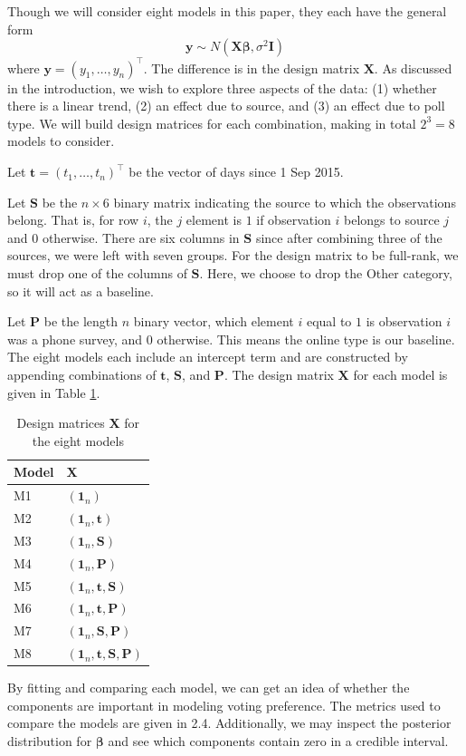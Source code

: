 \documentclass{asaproc}
\newcommand{\m}[1]{\mathbf{\bm{#1}}}
\begin{document}
Though we will consider eight models in this paper, they each have the general form
\[ \m{y} \sim N(\m{X} \m{\beta}, \sigma^2 \m{I}) \]
where $\m{y}=(y_1,\ldots,y_n)^\top$. The difference is in the design matrix $\m{X}$. As discussed in the introduction, we wish to explore three aspects of the data: (1) whether there is a linear trend, (2) an effect due to source, and (3) an effect due to poll type. We will build design matrices for each combination, making in total $2^3=8$ models to consider.

Let $\m{t}=(t_1,\ldots,t_n)^\top$ be the vector of days since 1 Sep 2015.

Let $\m{S}$ be the $n\times 6$ binary matrix indicating the source to which the observations belong. That is, for row $i$, the $j$ element is $1$ if observation $i$ belongs to source $j$ and $0$ otherwise. There are six columns in $\m{S}$ since after combining three of the sources, we were left with seven groups. For the design matrix to be full-rank, we must drop one of the columns of $\m{S}$. Here, we choose to drop the Other category, so it will act as a baseline. 

Let $\m{P}$ be the length $n$ binary vector, which element $i$ equal to $1$ is observation $i$ was a phone survey, and $0$ otherwise. This means the online type is our baseline. The eight models each include an intercept term and are constructed by appending combinations of $\m{t}$, $\m{S}$, and $\m{P}$. The design matrix $\m{X}$ for each model is given in Table \ref{models}.
\begin{table}
\caption{Design matrices $\m{X}$ for the eight models}
\centering
\begin{tabular}{ll}
\\ [-5pt]
\hline \hline
Model & $\m{X}$                             \\ \hline
M1    & $(\m{1}_n)$                         \\
M2    & $(\m{1}_n, \m{t})$                  \\
M3    & $(\m{1}_n, \m{S})$                  \\
M4    & $(\m{1}_n, \m{P})$                  \\
M5    & $(\m{1}_n, \m{t}, \m{S})$           \\
M6    & $(\m{1}_n, \m{t}, \m{P})$           \\
M7    & $(\m{1}_n, \m{S}, \m{P})$           \\
M8    & $(\m{1}_n, \m{t}, \m{S}, \m{P})$    \\ \hline\hline
\end{tabular}
\label{models}
\end{table}
By fitting and comparing each model, we can get an idea of whether the components are important in modeling voting preference. The metrics used to compare the models are given in 2.4. Additionally, we may inspect the posterior distribution for $\m{\beta}$ and see which components contain zero in a credible interval.
\end{document}
